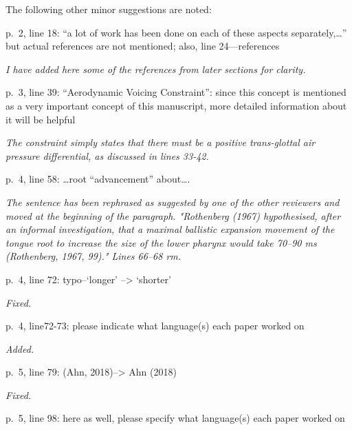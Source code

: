 \documentclass[]{article}
\begin{document}
The following other minor suggestions are noted:

p.~2, line 18: ``a lot of work has been done on each of these aspects
separately,\ldots{}'' but actual references are not mentioned; also,
line 24---references

\begin{adjustwidth}{1cm}{} \textit{
I have added here some of the references from later sections for clarity.
} \end{adjustwidth}

p.~3, line 39: ``Aerodynamic Voicing Constraint'': since this concept is
mentioned as a very important concept of this manuscript, more detailed
information about it will be helpful

\begin{adjustwidth}{1cm}{} \textit{
The constraint simply states that there must be a positive trans-glottal air pressure differential, as discussed in lines 33-42.
} \end{adjustwidth}

p.~4, line 58: \ldots{}root ``advancement'' about\ldots{}.

\begin{adjustwidth}{1cm}{} \textit{
The sentence has been rephrased as suggested by one of the other reviewers and moved at the beginning of the paragraph. "Rothenberg (1967) hypothesised, after an informal investigation, that a maximal ballistic expansion movement of the tongue root to increase the size of the lower pharynx would take 70–90 ms (Rothenberg, 1967, 99)." Lines 66--68 rm.
} \end{adjustwidth}

p.~4, line 72: typo--`longer' --\textgreater{} `shorter'

\begin{adjustwidth}{1cm}{} \textit{
Fixed.
} \end{adjustwidth}

p.~4, line72-73: please indicate what language(s) each paper worked on

\begin{adjustwidth}{1cm}{} \textit{
Added.
} \end{adjustwidth}

p.~5, line 79: (Ahn, 2018)--\textgreater{} Ahn (2018)

\begin{adjustwidth}{1cm}{} \textit{
Fixed.
} \end{adjustwidth}

p.~5, line 98: here as well, please specify what language(s) each paper
worked on
\end{document}
